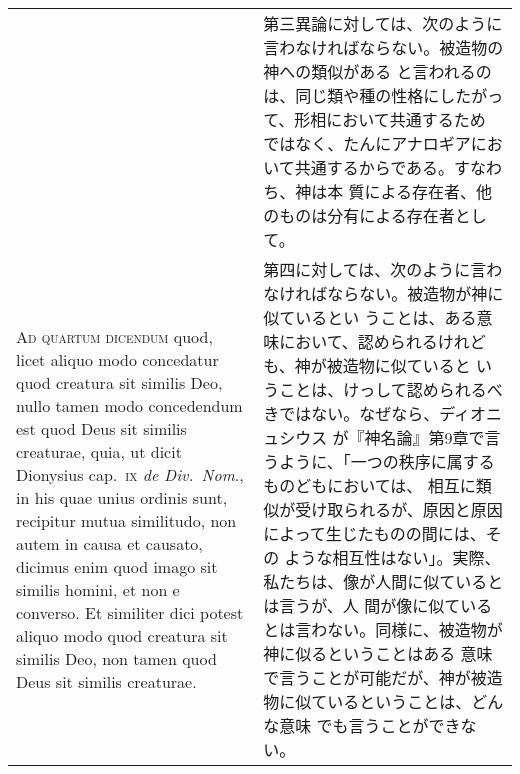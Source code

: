 \documentclass[10pt]{jsarticle} %
\begin{document}
\begin{longtable}{p{21em}p{21em}}
&

第三異論に対しては、次のように言わなければならない。被造物の神への類似がある
 と言われるのは、同じ類や種の性格にしたがって、形相において共通するため
 ではなく、たんにアナロギアにおいて共通するからである。すなわち、神は本
 質による存在者、他のものは分有による存在者として。

\\

{\scshape Ad quartum dicendum} quod, licet aliquo modo concedatur quod
 creatura sit similis Deo, nullo tamen modo concedendum est quod Deus
 sit similis creaturae, quia, ut dicit Dionysius cap.~{\scshape ix}
 {\itshape de Div.~Nom}., in his quae unius ordinis sunt, recipitur
 mutua similitudo, non autem in causa et causato, dicimus enim quod
 imago sit similis homini, et non e converso. Et similiter dici potest
 aliquo modo quod creatura sit similis Deo, non tamen quod Deus sit
 similis creaturae.
&

第四に対しては、次のように言わなければならない。被造物が神に似ているとい
 うことは、ある意味において、認められるけれども、神が被造物に似ていると
 いうことは、けっして認められるべきではない。なぜなら、ディオニュシウス
 が『神名論』第9章で言うように、「一つの秩序に属するものどもにおいては、
 相互に類似が受け取られるが、原因と原因によって生じたものの間には、その
 ような相互性はない」。実際、私たちは、像が人間に似ているとは言うが、人
 間が像に似ているとは言わない。同様に、被造物が神に似るということはある
 意味で言うことが可能だが、神が被造物に似ているということは、どんな意味
 でも言うことができない。

\end{longtable}
\end{document}
